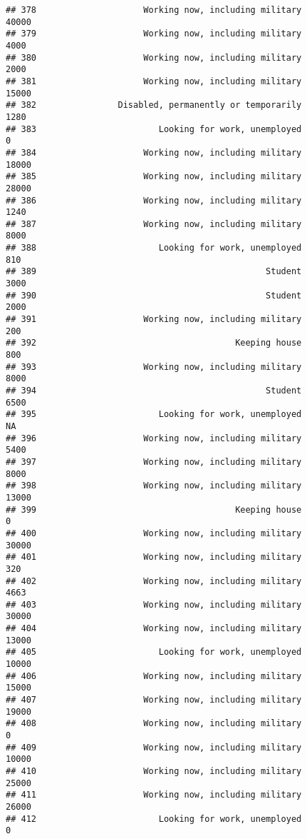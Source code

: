 \documentclass[]{book}
\theoremstyle{definition}
\theoremstyle{definition}
\theoremstyle{remark}
\begin{document}
\begin{verbatim}
## 378                     Working now, including military           40000
## 379                     Working now, including military            4000
## 380                     Working now, including military            2000
## 381                     Working now, including military           15000
## 382                Disabled, permanently or temporarily            1280
## 383                        Looking for work, unemployed               0
## 384                     Working now, including military           18000
## 385                     Working now, including military           28000
## 386                     Working now, including military            1240
## 387                     Working now, including military            8000
## 388                        Looking for work, unemployed             810
## 389                                             Student            3000
## 390                                             Student            2000
## 391                     Working now, including military             200
## 392                                       Keeping house             800
## 393                     Working now, including military            8000
## 394                                             Student            6500
## 395                        Looking for work, unemployed              NA
## 396                     Working now, including military            5400
## 397                     Working now, including military            8000
## 398                     Working now, including military           13000
## 399                                       Keeping house               0
## 400                     Working now, including military           30000
## 401                     Working now, including military             320
## 402                     Working now, including military            4663
## 403                     Working now, including military           30000
## 404                     Working now, including military           13000
## 405                        Looking for work, unemployed           10000
## 406                     Working now, including military           15000
## 407                     Working now, including military           19000
## 408                     Working now, including military               0
## 409                     Working now, including military           10000
## 410                     Working now, including military           25000
## 411                     Working now, including military           26000
## 412                        Looking for work, unemployed               0

\end{verbatim}
\end{document}
